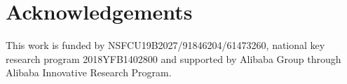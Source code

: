 \section{Acknowledgements}
This work is funded by NSFCU19B2027/91846204/61473260, national key research program 2018YFB1402800 and supported by Alibaba Group through Alibaba Innovative Research Program.
